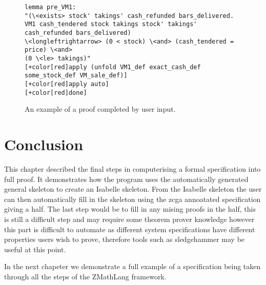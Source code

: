 \begin{center}
\begin{figure}[H]
\centering
\begin{footnotesize}
\begin{BVerbatim}[commandchars=+\[\]]
lemma pre_VM1: 
"(\<exists> stock' takings' cash_refunded bars_delivered.
VM1 cash_tendered stock takings stock' takings' cash_refunded bars_delivered)
\<longleftrightarrow> (0 < stock) \<and> (cash_tendered = price) \<and> 
(0 \<le> takings)"
[+color[red]apply (unfold VM1_def exact_cash_def some_stock_def VM_sale_def)]
[+color[red]apply auto]
[+color[red]done]
\end{BVerbatim}
\end{footnotesize}
\caption{\label{fig:exampleproof} An example of a proof completed by user input.}
\end{figure}
\end{center}

\section{Conclusion}

This chapter described the final steps in computerising a formal specification into full proof. It demonstrates how the program uses the automatically generated general skeleton to  create an Isabelle skeleton. From the Isabelle skeleton the user can then automatically fill in the skeleton using the \gls{zcga} annoatated specification giving a \gls{half}. The last step would be to fill in any mising proofs in the \gls{half}, this is still a difficult step and may require some theorem prover knowledge however this part is difficult to automate as different system specifications have different properties users wish to prove, therefore tools such as sledgehammer \cite{sledgehammer} may be useful at this point.

In the next chapeter we demonstrate a full example of a specification being taken through all the steps of the ZMathLang framework.